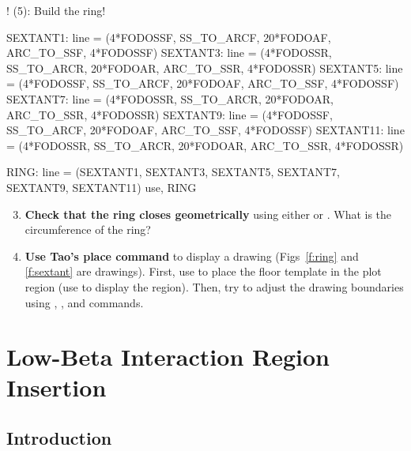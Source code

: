 \documentclass{hitec}     %
\begin{document}
{\begin{enumerate}[leftmargin=*]
\end{enumerate}
\begin{code}
! (5): Build the ring!

SEXTANT1:  line = (4*FODOSSF, SS_TO_ARCF, 20*FODOAF, ARC_TO_SSF, 4*FODOSSF)
SEXTANT3:  line = (4*FODOSSR, SS_TO_ARCR, 20*FODOAR, ARC_TO_SSR, 4*FODOSSR)
SEXTANT5:  line = (4*FODOSSF, SS_TO_ARCF, 20*FODOAF, ARC_TO_SSF, 4*FODOSSF)
SEXTANT7:  line = (4*FODOSSR, SS_TO_ARCR, 20*FODOAR, ARC_TO_SSR, 4*FODOSSR)
SEXTANT9:  line = (4*FODOSSF, SS_TO_ARCF, 20*FODOAF, ARC_TO_SSF, 4*FODOSSF)
SEXTANT11: line = (4*FODOSSR, SS_TO_ARCR, 20*FODOAR, ARC_TO_SSR, 4*FODOSSR)

RING: line = (SEXTANT1, SEXTANT3, SEXTANT5, SEXTANT7, SEXTANT9, SEXTANT11)
use, RING
\end{code}

\begin{enumerate}[leftmargin=*]
\setcounter{enumi}{2}
\item \textbf{Check that the ring closes geometrically} using either  or . What is the circumference of the ring?
%
\item \textbf{Use Tao's place command} to display a  drawing (Figs~\ref{f:ring} and \ref{f:sextant}
are  drawings). First, use  to place the floor template in the plot region (use  to display the region). Then, try to adjust the drawing boundaries using , , and  commands.
%
\end{enumerate}

\newpage

\section{Low-Beta Interaction Region Insertion}

\subsection{Introduction}

}
\end{document}
